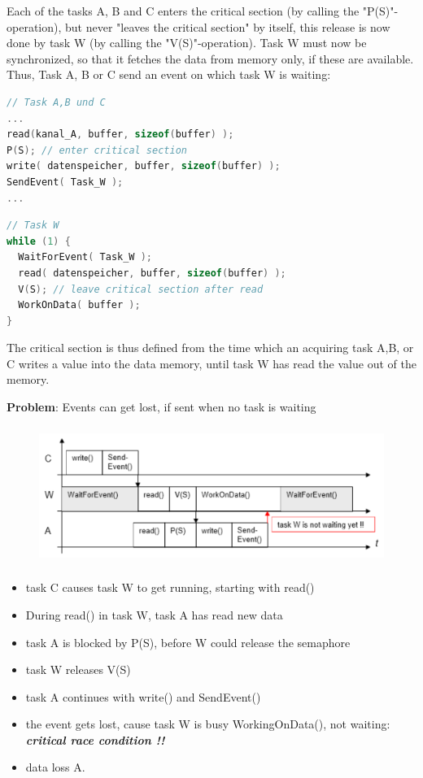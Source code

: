Each of the tasks A, B and C enters the critical section (by calling the "P(S)"-operation), but never "leaves the critical section" by itself, this release is now done by task W (by calling the "V(S)"-operation). Task W must now be synchronized, so that it fetches the data from memory only, if these are available. Thus, Task A, B or C send an event on which task W is waiting:\\

\begin{lstlisting}[style=mystyle, language=c]
// Task A,B und C
...
read(kanal_A, buffer, sizeof(buffer) );
P(S); // enter critical section
write( datenspeicher, buffer, sizeof(buffer) );
SendEvent( Task_W );
...
\end{lstlisting}

\begin{lstlisting}[style=mystyle, language=c]
// Task W
while (1) {
  WaitForEvent( Task_W );
  read( datenspeicher, buffer, sizeof(buffer) );
  V(S); // leave critical section after read
  WorkOnData( buffer );
}
\end{lstlisting}

The critical section is thus defined from the time which an acquiring task A,B, or C writes a value into the data memory, until task W has read the value out of the memory.\\
\os{\newpage}

\textbf{Problem}: Events can get lost, if sent when no task is waiting

 	\begin{figure}[h]
    \centering
    \includegraphics[width=14cm, height=4.5cm]{Images/image112.png}
    \label{fig:Fig 59}
    \end{figure}

\begin{itemize}
	\item task C causes task W to get running, starting with read()
	\item During read() in task W, task A has read new data
	\item task A is blocked by P(S), before W could release the semaphore
	\item task W releases V(S)
	\item task A continues with write() and SendEvent()
	\item the event gets lost, cause task W is busy WorkingOnData(), not waiting:  \textbf{\textit{critical race condition !!}}
	\item data loss A.
\end{itemize}
\nsl{\newpage}

